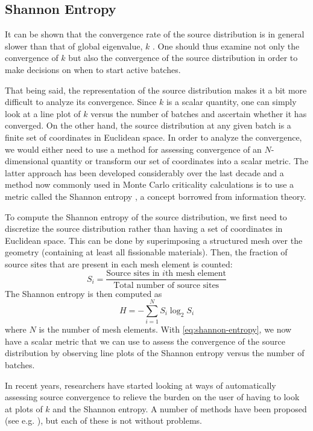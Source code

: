 \subsection{Shannon Entropy}

It can be shown that the convergence rate of the source distribution is in
general slower than that of global eigenvalue, $k$ \cite{lanl-brown-2005}. One
should thus examine not only the convergence of $k$ but also the convergence of
the source distribution in order to make decisions on when to start active
batches.

That being said, the representation of the source distribution makes it a bit
more difficult to analyze its convergence. Since $k$ is a scalar quantity, one
can simply look at a line plot of $k$ versus the number of batches and ascertain
whether it has converged. On the other hand, the source distribution at any
given batch is a finite set of coordinates in Euclidean space. In order to
analyze the convergence, we would either need to use a method for assessing
convergence of an $N$-dimensional quantity or transform our set of coordinates
into a scalar metric. The latter approach has been developed considerably over
the last decade and a method now commonly used in Monte Carlo criticality
calculations is to use a metric called the Shannon entropy
\cite{physor-brown-2006}, a concept borrowed from information theory.

To compute the Shannon entropy of the source distribution, we first need to
discretize the source distribution rather than having a set of coordinates in
Euclidean space. This can be done by superimposing a structured mesh over the
geometry (containing at least all fissionable materials). Then, the fraction of
source sites that are present in each mesh element is counted:
\begin{equation}
  \label{eq:fraction-source}
  S_i = \frac{\text{Source sites in $i$th mesh element}}{\text{Total number of
      source sites}}
\end{equation}
The Shannon entropy is then computed as
\begin{equation}
  \label{eq:shannon-entropy}
  H = - \sum_{i=1}^N S_i \log_2 S_i
\end{equation}
where $N$ is the number of mesh elements. With \eqref{eq:shannon-entropy}, we
now have a scalar metric that we can use to assess the convergence of the source
distribution by observing line plots of the Shannon entropy versus the number of
batches.

In recent years, researchers have started looking at ways of automatically
assessing source convergence to relieve the burden on the user of having to look
at plots of $k$ and the Shannon entropy. A number of methods have been proposed
(see e.g. \cite{mc-romano-2009, trans-ueki-2008}), but each of these is not
without problems.
